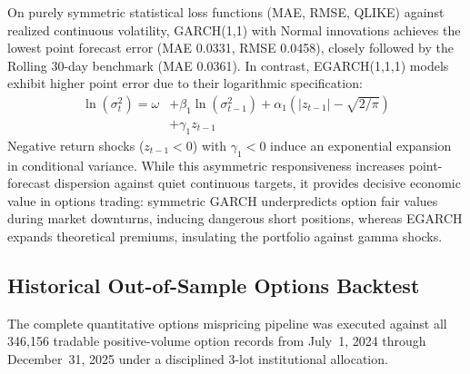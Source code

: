 \documentclass[journal]{IEEEtran}
\begin{document}
On purely symmetric statistical loss functions (MAE, RMSE, QLIKE) against realized continuous volatility, GARCH(1,1) with Normal innovations achieves the lowest point forecast error (MAE 0.0331, RMSE 0.0458), closely followed by the Rolling 30-day benchmark (MAE 0.0361). In contrast, EGARCH(1,1,1) models exhibit higher point error due to their logarithmic specification:
\begin{equation}
\begin{aligned}
\ln(\sigma_t^2) = \omega &+ \beta_1 \ln(\sigma_{t-1}^2) + \alpha_1 \left( |z_{t-1}| - \sqrt{2/\pi} \right) \\
&+ \gamma_1 z_{t-1}
\end{aligned}
\end{equation}
Negative return shocks ($z_{t-1} < 0$) with $\gamma_1 < 0$ induce an exponential expansion in conditional variance. While this asymmetric responsiveness increases point-forecast dispersion against quiet continuous targets, it provides decisive economic value in options trading: symmetric GARCH underpredicts option fair values during market downturns, inducing dangerous short positions, whereas EGARCH expands theoretical premiums, insulating the portfolio against gamma shocks.

\subsection{Historical Out-of-Sample Options Backtest}
The complete quantitative options mispricing pipeline was executed against all 346{,}156 tradable positive-volume option records from July~1, 2024 through December~31, 2025 under a disciplined 3-lot institutional allocation.
\end{document}
